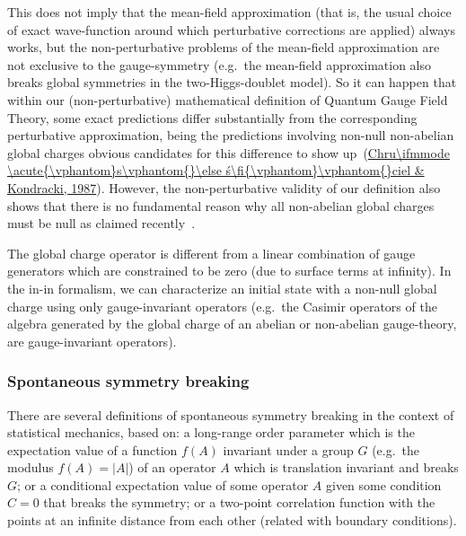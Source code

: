 \documentclass[11pt]{book}
\begin{document}
This does not imply that the mean-field approximation (that is, the
usual choice of exact wave-function around which perturbative
corrections are applied) always works, but the non-perturbative problems
of the mean-field approximation are not exclusive to the gauge-symmetry
(e.g.~the mean-field approximation also breaks global symmetries in the
two-Higgs-doublet model). So it can happen that within our
(non-perturbative) mathematical definition of Quantum Gauge Field
Theory, some exact predictions differ substantially from the
corresponding perturbative approximation, being the predictions
involving non-null non-abelian global charges obvious candidates for
this difference to show
up~\cite{Salmela2005Gaussux2019s}\cite{Ferreira2012Integral}(\protect\hyperlink{ref-Chru1987Some}{Chru\textbackslash ifmmode
\textbackslash acute\{\textbackslash vphantom\}s\textbackslash vphantom\{\}\textbackslash else
ś\textbackslash fi\{\textbackslash vphantom\}\textbackslash vphantom\{\}ciel
\& Kondracki, 1987})\cite{Gomes2019unified}. However, the non-perturbative validity of
our definition also shows that there is no fundamental reason why all
non-abelian global charges must be null as claimed
recently~\cite{Maas2017On}.

The global charge operator is different from a linear combination of
gauge generators which are constrained to be zero (due to surface terms
at infinity). In the in-in formalism, we can characterize an initial
state with a non-null global charge using only gauge-invariant operators
(e.g.~the Casimir operators of the algebra generated by the global
charge of an abelian or non-abelian gauge-theory, are gauge-invariant
operators).

\hypertarget{spontaneous-symmetry-breaking}{%
\subsubsection{Spontaneous symmetry
breaking}\label{spontaneous-symmetry-breaking}}

There are several definitions of spontaneous symmetry breaking in the
context of statistical mechanics, based on: a long-range order parameter
which is the expectation value of a function \(f(A)\) invariant under a
group \(G\) (e.g.~the modulus \(f(A)=|A|\)) of an operator \(A\) which
is translation invariant and breaks \(G\); or a conditional expectation
value of some operator \(A\) given some condition \(C=0\) that breaks
the symmetry; or a two-point correlation function with the points at an
infinite distance from each other (related with boundary
conditions)\cite{Yang1952Spontaneous}.
\end{document}

